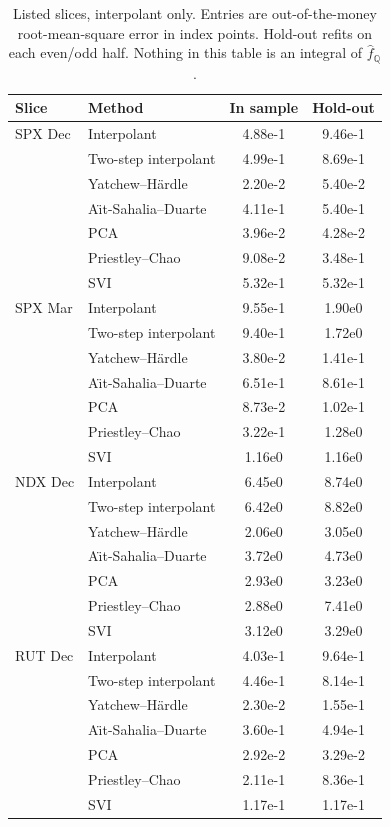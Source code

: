 \documentclass[preprint,12pt,authoryear,times]{elsarticle}
\newcommand{\Q}{\mathbb{Q}}
\begin{document}
\begin{table}[H]
\centering
\caption{Listed slices, interpolant only. Entries are out-of-the-money root-mean-square error in index points. Hold-out refits on each even/odd half. Nothing in this table is an integral of \(\hat f_{\Q}\).}
\label{tab:listed}
\begin{tabular}{ll *{2}{S[table-format=1.2e-1,scientific-notation=true]}}
\toprule
Slice & Method & {In sample} & {Hold-out} \\
\midrule
SPX Dec & Interpolant & 4.88e-1 & 9.46e-1 \\
 & Two-step interpolant & 4.99e-1 & 8.69e-1 \\
 & Yatchew--H\"ardle & 2.20e-2 & 5.40e-2 \\
 & A\"{\i}t-Sahalia--Duarte & 4.11e-1 & 5.40e-1 \\
 & PCA & 3.96e-2 & 4.28e-2 \\
 & Priestley--Chao & 9.08e-2 & 3.48e-1 \\
 & SVI & 5.32e-1 & 5.32e-1 \\
\midrule
SPX Mar & Interpolant & 9.55e-1 & 1.90e0 \\
 & Two-step interpolant & 9.40e-1 & 1.72e0 \\
 & Yatchew--H\"ardle & 3.80e-2 & 1.41e-1 \\
 & A\"{\i}t-Sahalia--Duarte & 6.51e-1 & 8.61e-1 \\
 & PCA & 8.73e-2 & 1.02e-1 \\
 & Priestley--Chao & 3.22e-1 & 1.28e0 \\
 & SVI & 1.16e0 & 1.16e0 \\
\midrule
NDX Dec & Interpolant & 6.45e0 & 8.74e0 \\
 & Two-step interpolant & 6.42e0 & 8.82e0 \\
 & Yatchew--H\"ardle & 2.06e0 & 3.05e0 \\
 & A\"{\i}t-Sahalia--Duarte & 3.72e0 & 4.73e0 \\
 & PCA & 2.93e0 & 3.23e0 \\
 & Priestley--Chao & 2.88e0 & 7.41e0 \\
 & SVI & 3.12e0 & 3.29e0 \\
\midrule
RUT Dec & Interpolant & 4.03e-1 & 9.64e-1 \\
 & Two-step interpolant & 4.46e-1 & 8.14e-1 \\
 & Yatchew--H\"ardle & 2.30e-2 & 1.55e-1 \\
 & A\"{\i}t-Sahalia--Duarte & 3.60e-1 & 4.94e-1 \\
 & PCA & 2.92e-2 & 3.29e-2 \\
 & Priestley--Chao & 2.11e-1 & 8.36e-1 \\
 & SVI & 1.17e-1 & 1.17e-1 \\
\bottomrule
\end{tabular}
\end{table}
\end{document}
